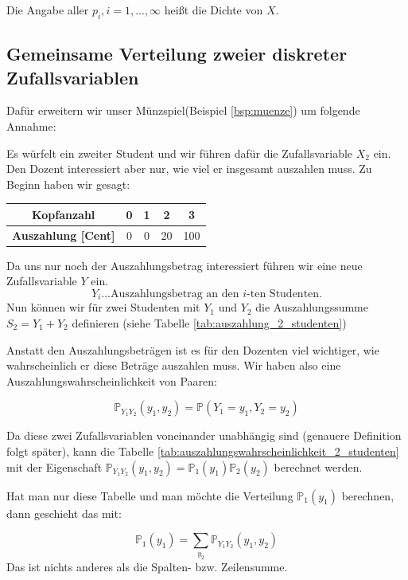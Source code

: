 {    Die Angabe aller $p_{i},i=1,...,{\infty}$ heißt die Dichte von $X$.

    \subsection{Gemeinsame Verteilung zweier diskreter Zufallsvariablen}
    \begin{bsp}\label{bsp:muenze_3}Dafür erweitern wir unser Münzspiel(Beispiel \ref{bsp:muenze}) um folgende Annahme: 

    Es würfelt ein zweiter Student und wir führen
    dafür die Zufallsvariable $X_{2}$ ein. Den Dozent interessiert aber nur, wie viel er insgesamt auszahlen
    muss. Zu Beginn haben wir gesagt:

    \begin{center}
    \begin{tabular}{ccccc}
    \textbf{Kopfanzahl} & 0 & 1 & 2 & 3\\
    \hline
    \textbf{Auszahlung [Cent]} & 0 & 0 & 20 & 100
    \end{tabular}
    \end{center}

    Da uns nur noch der Auszahlungsbetrag interessiert führen wir eine neue Zufallsvariable $Y$ ein.
    \[Y_i...\text{Auszahlungsbetrag an den }i\text{-ten Studenten.}\]
    Nun können wir für zwei Studenten mit $Y_{1}$ und $Y_{2}$ die Auszahlungssumme $S_{2}=Y_{1}+Y_{2}$ definieren 
    (siehe Tabelle \ref{tab:auszahlung_2_studenten})

    Anstatt den Auszahlungsbeträgen ist es für den Dozenten viel wichtiger,
    wie wahrscheinlich er diese Beträge auszahlen muss. Wir haben also eine
    Auszahlungswahrscheinlichkeit von Paaren:

    \[\mathbb P_{Y_{1}Y_{2}}\left(y_{1},y_{2}\right)=\mathbb P\left(Y_{1}=y_{1},Y_{2}=y_{2}\right)\]

    Da diese zwei Zufallsvariablen voneinander unabhängig sind (genauere Definition folgt später), kann %
    die Tabelle \ref{tab:auszahlungswahrscheinlichkeit_2_studenten} mit der Eigenschaft
    $\mathbb P_{Y_{1}Y_{2}}\left(y_{1},y_{2}\right)=\mathbb P_{1}\left(y_{1}\right)\mathbb P_{2}(y_{2})$
    berechnet werden.

    Hat man nur diese Tabelle und man
    möchte die Verteilung $\mathbb P_{1}\left(y_{1}\right)$ berechnen, dann geschieht das mit:

    \[
    \mathbb P_{1}\left(y_{1}\right)=\sum_{y_2}{\mathbb P_{Y_{1}Y_{2}}(y_{1},y_{2})}
    \]
    Das ist nichts anderes als die Spalten- bzw. Zeilensumme. 


\end{bsp}}
